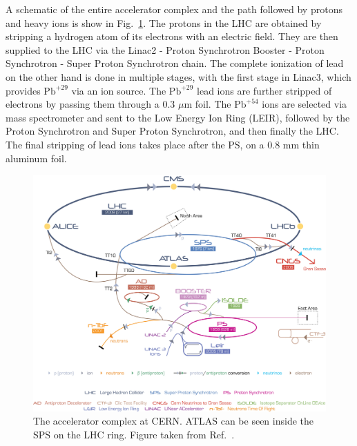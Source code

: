 A schematic of the entire accelerator complex and the path followed by protons and heavy ions is show in Fig.~\ref{fig:cern}.
The protons in the LHC are obtained by stripping a hydrogen atom of its electrons with an electric field.
They are then supplied to the LHC via the Linac2 - Proton Synchrotron Booster - Proton Synchrotron - Super Proton Synchrotron chain.
The complete ionization of lead on the other hand is done in multiple stages, with the first stage in Linac3, which provides $\mathrm{Pb}^{+29}$ via an ion source.
The $\mathrm{Pb}^{+29}$ lead ions are further stripped of electrons by passing them through a 0.3 $\mu$m foil.
The $\mathrm{Pb}^{+54}$ ions are selected via mass spectrometer and sent to the Low Energy Ion Ring (LEIR), followed by the Proton Synchrotron and Super Proton Synchrotron, and then finally the LHC.
The final stripping of lead ions takes place after the PS, on a 0.8 mm thin aluminum foil.


\begin{figure}[ht]
	\centering
	\includegraphics[width=1.\textwidth]{figures/setup/cern.jpg} %
	\caption{The accelerator complex at CERN.
ATLAS can be seen inside the SPS on the LHC ring.
Figure taken from Ref.~\cite{Christiane:1260465}.}
	\label{fig:cern}%
\end{figure}


